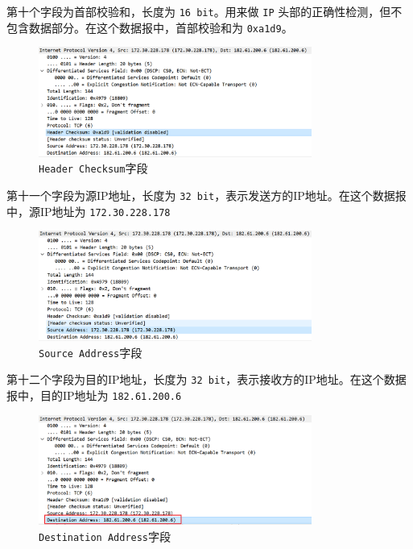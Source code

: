 \documentclass{article}
\begin{document}
第十个字段为首部校验和，长度为 \texttt{16 bit}。用来做 \texttt{IP} 头部的正确性检测，但不包含数据部分。在这个数据报中，首部校验和为 \texttt{0xa1d9}。

\begin{figure}[H]
  \centering
  \includegraphics[width=0.8\textwidth]{img/18.png}
  \caption{\texttt{Header Checksum}字段}
  \label{fig:17}
\end{figure}

第十一个字段为源IP地址，长度为 \texttt{32 bit}，表示发送方的IP地址。在这个数据报中，源IP地址为 \texttt{172.30.228.178}

\begin{figure}[H]
  \centering
  \includegraphics[width=0.8\textwidth]{img/19.png}
  \caption{\texttt{Source Address}字段}
  \label{fig:18}
\end{figure}

第十二个字段为目的IP地址，长度为 \texttt{32 bit}，表示接收方的IP地址。在这个数据报中，目的IP地址为 \texttt{182.61.200.6}

\begin{figure}[H]
  \centering
  \includegraphics[width=0.8\textwidth]{img/20.png}
  \caption{\texttt{Destination Address}字段}
  \label{fig:19}
\end{figure}
\end{document}
